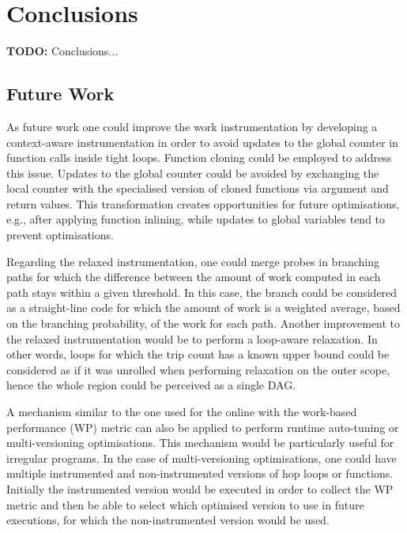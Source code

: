 \chapter{Conclusions}\label{chap:conclusion}

\textbf{TODO:} Conclusions...

\section{Future Work}

As future work one could improve the work instrumentation by developing a context-aware instrumentation in order to avoid updates to the global counter in function calls inside tight loops.
Function cloning could be employed to address this issue.
Updates to the global counter could be avoided by exchanging the local counter with the specialised version of cloned functions via argument and return values.
This transformation creates opportunities for future optimisations, e.g., after applying function inlining, while updates to global variables tend to prevent optimisations.

Regarding the relaxed instrumentation,
one could merge probes in branching paths for which the difference between the amount of work computed in each path stays within a given threshold.
In this case, the branch could be considered as a straight-line code for which the amount of work is a weighted average, based on the branching probability, of the work for each path.
Another improvement to the relaxed instrumentation would be to perform a loop-aware relaxation.
In other words, loops for which the trip count has a known upper bound could be considered as if it was unrolled when performing relaxation on the outer scope, hence the whole region could be perceived as a single DAG.

A mechanism similar to the one used for the online {\itercomp} with the work-based performance (WP) metric can also be applied to perform
runtime auto-tuning or multi-versioning optimisations.
This mechanism would be particularly useful for irregular programs.
In the case of multi-versioning optimisations, one could have multiple instrumented and non-instrumented versions of hop loops or functions.
Initially the instrumented version would be executed in order to collect the WP metric and then be able to select which optimised version to use in future executions, 
for which the non-instrumented version would be used.

